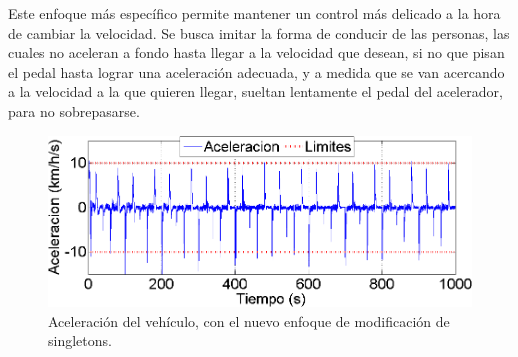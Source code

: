 %
%
%
%
%

Este enfoque más específico permite mantener un control más delicado a la hora de cambiar la velocidad. Se busca imitar la forma de conducir de las personas, las cuales no aceleran a fondo hasta llegar a la velocidad que desean, si no que pisan el pedal hasta lograr una aceleración adecuada, y a medida que se van acercando a la velocidad a la que quieren llegar, sueltan lentamente el pedal del acelerador, para no sobrepasarse.


\begin{figure}[h]
\centering
\includegraphics[width=0.6\linewidth,type=png,ext=.png,read=.png]{figures/freno4c}
\caption{Aceleración del vehículo, con el nuevo enfoque de modificación de singletons.}
\label{fig:freno4c}
\end{figure} 


